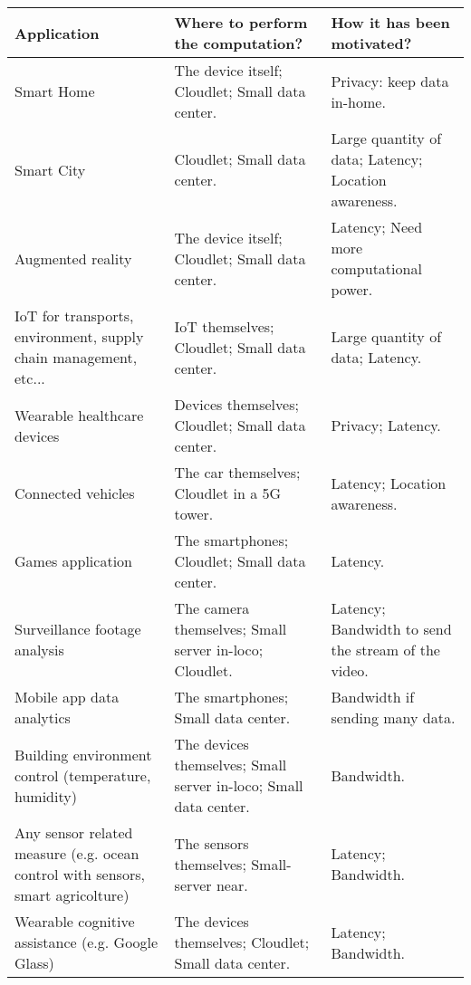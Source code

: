 \begin{tabularx}{\textwidth}{|X|X|X|}
\hline
\textbf{Application}            & \textbf{Where to perform the computation?}   & \textbf{How it has been motivated?}   \\ \hline \hline
Smart Home  \cite{edge-vision-and-challenges}    & The device itself; Cloudlet; Small data center.   & Privacy: keep data in-home.   \\ \hline
Smart City \cite{edge-vision-and-challenges} \cite{data-driven-stream}   & Cloudlet; Small data center.   & Large quantity of data; Latency; Location awareness.   \\ \hline
Augmented reality \cite{emergence-edge-computing}   & The device itself; Cloudlet; Small data center.   & Latency; Need more computational power.   \\ \hline
IoT for transports, environment, supply chain management, etc... \cite{lightweight-virtualization} & IoT themselves; Cloudlet; Small data center.   & Large quantity of data; Latency.   \\ \hline
Wearable healthcare devices \cite{mobile-edge-survey}   & Devices themselves; Cloudlet; Small data center.   & Privacy; Latency.   \\ \hline
Connected vehicles \cite{mobile-edge-survey} \cite{emergence-edge-computing}   & The car themselves; Cloudlet in a 5G tower.   & Latency; Location awareness.   \\ \hline
Games application \cite{google-edge-for-mmog}   & The smartphones; Cloudlet; Small data center.   & Latency.   \\ \hline
Surveillance footage analysis \cite{mobile-edge-survey} \cite{emergence-edge-computing} \cite{promise-of-edge-computing}   & The camera themselves; Small server in-loco; Cloudlet.   & Latency; Bandwidth to send the stream of the video.   \\ \hline
Mobile app data analytics \cite{mobile-edge-survey}   & The smartphones; Small data center.   & Bandwidth if sending many data.   \\ \hline
Building environment control (temperature, humidity) \cite{mobile-edge-survey}   & The devices themselves; Small server in-loco; Small data center.   & Bandwidth.   \\ \hline
Any sensor related measure (e.g. ocean control with sensors, smart agricolture) \cite{mobile-edge-survey} \cite{how-to-deploy-fog-applications}   & The sensors themselves; Small-server near.   & Latency; Bandwidth.   \\ \hline
Wearable cognitive assistance (e.g. Google Glass) \cite{stream-processing-survey-resource-elasticity}   & The devices themselves; Cloudlet; Small data center.   & Latency; Bandwidth.   \\ \hline

\end{tabularx}
